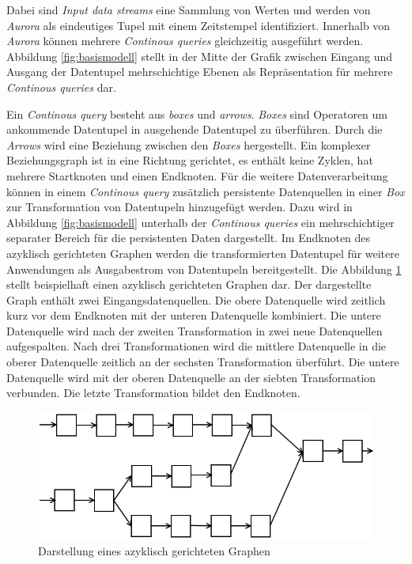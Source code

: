 Dabei sind \textit{Input data streams} eine Sammlung von Werten und werden von \textit{Aurora} als eindeutiges Tupel mit einem Zeitstempel identifiziert. Innerhalb von \textit{Aurora} können mehrere \textit{Continous queries} gleichzeitig ausgeführt werden. Abbildung \ref{fig:basismodell} stellt in der Mitte der Grafik zwischen Eingang und Ausgang der Datentupel mehrschichtige Ebenen als Repräsentation für mehrere \textit{Continous queries} dar.

Ein \textit{Continous query} besteht aus \textit{boxes }und \textit{arrows}. \textit{Boxes} sind Operatoren um ankommende Datentupel in ausgehende Datentupel zu überführen. Durch die \textit{Arrows} wird eine Beziehung zwischen den \textit{Boxes} hergestellt. Ein komplexer Beziehungsgraph ist in eine Richtung gerichtet, es enthält keine Zyklen, hat mehrere Startknoten und einen Endknoten. Für die weitere Datenverarbeitung können in einem \textit{Continous query} zusätzlich persistente Datenquellen in einer \textit{Box} zur Transformation von Datentupeln hinzugefügt werden. Dazu wird in Abbildung \ref{fig:basismodell} unterhalb der \textit{Continous queries} ein mehrschichtiger separater Bereich für die persistenten Daten dargestellt. Im Endknoten des azyklisch gerichteten Graphen werden die transformierten Datentupel für weitere Anwendungen als Ausgabestrom von Datentupeln bereitgestellt. Die Abbildung \ref{fig:dag} stellt beispielhaft einen azyklisch gerichteten Graphen dar. Der dargestellte Graph enthält zwei Eingangsdatenquellen. Die obere Datenquelle wird zeitlich kurz vor dem Endknoten mit der unteren Datenquelle kombiniert. Die untere Datenquelle wird nach der zweiten Transformation in zwei neue Datenquellen aufgespalten. Nach drei Transformationen wird die mittlere Datenquelle in die oberer Datenquelle zeitlich an der sechsten Transformation überführt. Die untere Datenquelle wird mit der oberen Datenquelle an der siebten Transformation verbunden. Die letzte Transformation bildet den Endknoten.

\begin{figure}[htb!]
\centering
\includegraphics[width=1.0\textwidth]{bilder/DAG.png}
\caption{Darstellung eines azyklisch gerichteten Graphen
\label{fig:dag}}
\end{figure}

